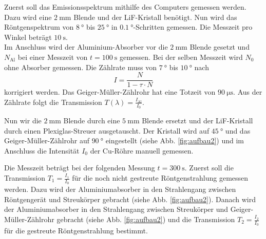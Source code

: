 Zuerst soll das Emissionsspektrum mithilfe des Computers gemessen werden.
Dazu wird eine $\SI{2}{\milli\metre}$ Blende und der LiF-Kristall benötigt.
Nun wird das Röntgenspektrum von $\SI{8}{\degree}$ bis $\SI{25}{\degree}$ in $\SI{0.1}{\degree}$-Schritten gemessen.
Die Messzeit pro Winkel beträgt $\SI{10}{\second}$.
\\
Im Anschluss wird der Aluminium-Absorber vor die $\SI{2}{\milli\metre}$ Blende gesetzt und $N_\text{Al}$ bei einer Messzeit von $t=\SI{100}{\second}$ gemessen.
Bei der selben Messzeit wird $N_0$ ohne Absorber gemessen.
Die Zählrate muss von $\SI{7}{\degree}$ bis $\SI{10}{\degree}$ nach
\begin{equation}
    I = \frac{N}{1 - \tau \cdot N}
    \label{eqn:totzeit}
\end{equation}
korrigiert werden.
Das Geiger-Müller-Zählrohr hat eine Totzeit von $\SI{90}{\micro\second}$.
Aus der Zählrate folgt die Transmission $T(\lambda) = \frac{I_\text{Al}}{I_0}$.

Nun wir die $\SI{2}{\milli\metre}$ Blende durch eine $\SI{5}{\milli\metre}$ Blende ersetzt und der LiF-Kristall durch einen Plexiglas-Streuer ausgetauscht.
Der Kristall wird auf $\SI{45}{\degree}$ und das Geiger-Müller-Zählrohr auf $\SI{90}{\degree}$ eingestellt (siehe Abb. \ref{fig:aufbau2}) und im Anschluss die Intensität $I_0$ der Cu-Röhre manuell gemessen.

Die Messzeit beträgt bei der folgenden Messung $t=\SI{300}{\second}$.
Zuerst soll die Transmission $T_1=\frac{I_1}{I_0}$ für die noch nicht gestreute Röntgenstrahlung gemessen werden.
Dazu wird der Aluminiumabsorber in den Strahlengang zwischen Röntgengerät und Streukörper gebracht (siehe Abb. \ref{fig:aufbau2}).
Danach wird der Aluminiumabsorber in den Strahlengang zwischen Streukörper und Geiger-Müller-Zählrohr gebracht (siehe Abb. \ref{fig:aufbau2}) und die Transmission $T_2=\frac{I_2}{I_0}$ für die gestreute Röntgenstrahlung bestimmt.